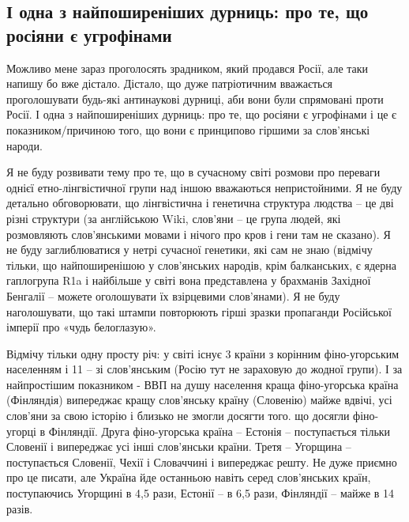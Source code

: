  
 
 
 
 

\subsection{І одна з найпоширеніших дурниць: про те, що росіяни є угрофінами}

Можливо мене зараз проголосять зрадником, який продався Росії, але таки напишу
бо вже дістало. Дістало, що дуже патріотичним вважається проголошувати будь-які
антинаукові дурниці, аби вони були спрямовані проти Росії. І одна з
найпоширеніших дурниць: про те, що росіяни є угрофінами і це є
показником/причиною того, що вони є принципово гіршими за слов’янські народи.

Я не буду розвивати тему про те, що в сучасному світі розмови про переваги
однієї етно-лінгвістичної групи над іншою вважаються непристойними. Я не буду
детально обговорювати, що лінгвістична і генетична структура людства – це дві
різні структури (за англійською Wiki, слов’яни – це група людей, які
розмовляють слов’янськими мовами і нічого про кров і гени там не сказано). Я не
буду заглиблюватися у нетрі сучасної генетики, які сам не знаю (відмічу тільки,
що найпоширенішою у слов’янських народів, крім балканських, є ядерна гаплогрупа
R1a і найбільше у світі вона представлена у брахманів Західної Бенгалії –
можете оголошувати їх взірцевими слов’янами). Я не буду наголошувати, що такі
штампи повторюють гірші зразки пропаганди Російської імперії про «чудь
белоглазую».

Відмічу тільки одну просту річ: у світі існує 3 країни з корінним
фіно-угорським населенням і 11 – зі слов’янським (Росію тут не зараховую до
жодної групи). І за найпростішим показником - ВВП на душу населення краща
фіно-угорська країна (Фінляндія) випереджає кращу слов’янську країну (Словенію)
майже вдвічі, усі слов’яни за свою історію і близько не змогли досягти того. що
досягли фіно-угорці в Фінляндії. Друга фіно-угорська країна – Естонія –
поступається тільки Словенії і випереджає усі інші слов’янськи країни. Третя –
Угорщина – поступається Словенії, Чехії і Словаччині і випереджає решту. Не
дуже приємно про це писати,  але Україна йде останньою навіть серед
слов’янських країн, поступаючись Угорщині в 4,5 рази, Естонії – в 6,5 рази,
Фінляндії – майже в 14 разів.

